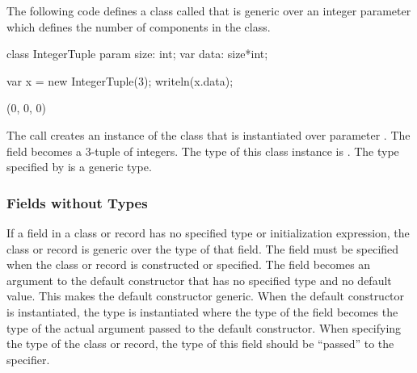 \begin{example}
The following code defines a class called  that is
generic over an integer parameter which defines the number of
components in the class.
\begin{chapelpre}
\end{chapelpre}
\begin{chapel}
class IntegerTuple {
  param size: int;
  var data: size*int;
}
\end{chapel}
\begin{chapelpost}
var x = new IntegerTuple(3);
writeln(x.data);
\end{chapelpost}
\begin{chapeloutput}
(0, 0, 0)
\end{chapeloutput}
The call  creates an instance of the
 class that is instantiated over parameter
.  The field  becomes a 3-tuple of integers.  The
type of this class instance is .  The type
specified by  is a generic type.
\end{example}

\subsubsection{Fields without Types}
\label{Fields_without_Types}

If a field in a class or record has no specified type or
initialization expression, the class or record is generic over the
type of that field.  The field must be specified when the class or
record is constructed or specified.  The field becomes an argument to
the default constructor that has no specified type and no default
value.  This makes the default constructor generic.  When the default
constructor is instantiated, the type is instantiated where the type
of the field becomes the type of the actual argument passed to the
default constructor.  When specifying the type of the class or record,
the type of this field should be ``passed'' to the specifier.

